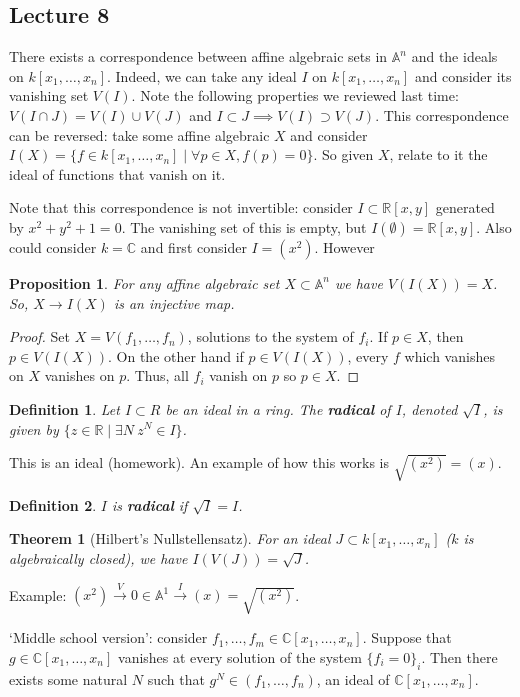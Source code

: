 \documentclass[12pt]{article}
\newcommand{\C}{\mathbb{C}}
\newcommand{\R}{\mathbb{R}}
\newcommand{\A}{\mathbb{A}}
\newtheorem{definition}{Definition}
\newtheorem{theorem}{Theorem}
\newtheorem{proposition}{Proposition}
\begin{document}
    \subsection{Lecture 8}
    There exists a correspondence between affine algebraic sets in $\A^n$ and the ideals on $k[x_1, \dots, x_n]$. Indeed, we can take any ideal $I$ on $k[x_1, \dots, x_n]$ and consider its vanishing set $V(I)$. Note the following properties we reviewed last time: $V(I \cap J) = V(I) \cup V(J)$ and $I \subset J \implies V(I) \supset V(J)$. This correspondence can be reversed: take some affine algebraic $X$ and consider $I(X) = \{f \in k[x_1, \dots, x_n] \mid \forall p \in X, f(p) = 0\}$. So given $X$, relate to it the ideal of functions that vanish on it. \par 
    Note that this correspondence is not invertible: consider $I \subset \R[x, y]$ generated by $x^2 + y^2 + 1 = 0$. The vanishing set of this is empty, but $I(\emptyset) = \R[x, y]$. Also could consider $k = \C$ and first consider $I = (x^2)$. However 
    \begin{proposition}
        For any affine algebraic set $X \subset \A^n$ we have $V(I(X)) = X$. So, $X \to I(X)$ is an injective map.
    \end{proposition}
    \begin{proof}
        Set $X = V(f_1, \dots, f_n)$, solutions to the system of $f_i$. If $p \in X$, then $p \in V(I(X))$. On the other hand if $p \in V(I(X))$, every $f$ which vanishes on $X$ vanishes on $p$. Thus, all $f_i$ vanish on $p$ so $p \in X$. 
    \end{proof}
    \begin{definition}
        Let $I \subset R$ be an ideal in a ring. The \textbf{radical} of $I$, denoted $\sqrt{I}$, is given by $\{z \in \R \mid \exists N\: z^N \in I\}$. 
    \end{definition}
    This is an ideal (homework). An example of how this works is $\sqrt{(x^2)} = (x)$. 
    \begin{definition}
        $I$ is \textbf{radical} if $\sqrt{I} = I$. 
    \end{definition}
    \begin{theorem}
        [Hilbert's Nullstellensatz] For an ideal $J \subset k[x_1, \dots, x_n]$ ($k$ is algebraically closed), we have $I(V(J)) = \sqrt{J}$.  
    \end{theorem}
    Example: $(x^2) \xrightarrow{V} 0 \in \A^1 \xrightarrow{I} (x) = \sqrt{(x^2)}$. \par 
    `Middle school version': consider $f_1, \dots, f_m \in \C[x_1, \dots, x_n]$. Suppose that $g \in \C[x_1, \dots, x_n]$ vanishes at every solution of the system $\{f_i = 0\}_i$. Then there exists some natural $N$ such that $g^N \in (f_1, \dots, f_n)$, an ideal of $\C[x_1, \dots, x_n]$. \par 
\end{document}

